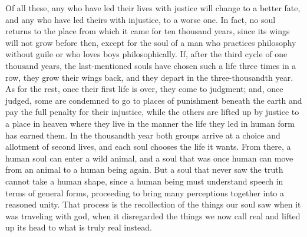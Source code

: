 Of all these, any who have led their lives with justice will change to
a better fate, and any who have led theirs with injustice, to a worse
one. In fact, no soul returns to the place from which it came for ten
thousand years, since its wings will not grow before
then, except for the soul of a man who practices philosophy without
guile or who loves boys philosophically. If, after the third cycle of
one thousand years, the last-mentioned souls have chosen such a life
three times in a row, they grow their wings back, and they depart in the
three-thousandth year. As for the rest, once their first life is over,
they come to judgment; and, once judged, some are condemned to go to
places of punishment beneath the earth and pay the full penalty for
their injustice, while the others are lifted up by justice to a place in
heaven where they live in the manner the life they led in human 
form has earned them. In the thousandth year both groups arrive at a
choice and allotment of second lives, and each soul chooses the life it
wants. From there, a human soul can enter a wild animal, and a soul that
was once human can move from an animal to a human being again. But a
soul that never saw the truth cannot take a human shape, since a human
being must understand speech in terms of general forms, proceeding to 
bring many perceptions together into a reasoned
unity. That process is
the recollection of the things our soul saw when it was traveling with
god, when it disregarded the things we now call real and lifted up its
head to what is truly real instead.

